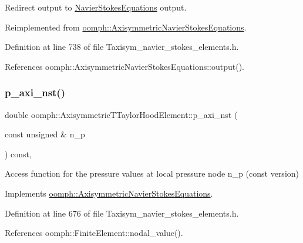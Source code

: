 Redirect output to \hyperlink{classoomph_1_1NavierStokesEquations}{Navier\+Stokes\+Equations} output. 



Reimplemented from \hyperlink{classoomph_1_1AxisymmetricNavierStokesEquations_abc2ca00250845e243da3f4e0845b2c96}{oomph\+::\+Axisymmetric\+Navier\+Stokes\+Equations}.



Definition at line 738 of file Taxisym\+\_\+navier\+\_\+stokes\+\_\+elements.\+h.



References oomph\+::\+Axisymmetric\+Navier\+Stokes\+Equations\+::output().

\mbox{\label{classoomph_1_1AxisymmetricTTaylorHoodElement_ab08a53f82fad2eee4a016d3ebaba0a0a}} 
\subsubsection{\texorpdfstring{p\+\_\+axi\+\_\+nst()}{p\_axi\_nst()}}
{\footnotesize\ttfamily double oomph\+::\+Axisymmetric\+T\+Taylor\+Hood\+Element\+::p\+\_\+axi\+\_\+nst (\begin{DoxyParamCaption}\item[{const unsigned \&}]{n\+\_\+p }\end{DoxyParamCaption}) const\hspace{0.3cm}{\ttfamily [inline]}, {\ttfamily [virtual]}}



Access function for the pressure values at local pressure node n\+\_\+p (const version) 



Implements \hyperlink{classoomph_1_1AxisymmetricNavierStokesEquations_a3aa173227f477a40fb4adba84a337f5b}{oomph\+::\+Axisymmetric\+Navier\+Stokes\+Equations}.



Definition at line 676 of file Taxisym\+\_\+navier\+\_\+stokes\+\_\+elements.\+h.



References oomph\+::\+Finite\+Element\+::nodal\+\_\+value().

